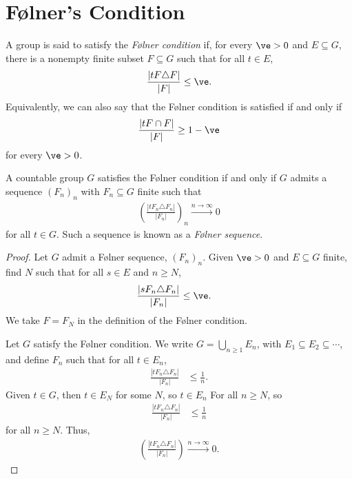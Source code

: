\section{Følner's Condition}%
\begin{definition}\label{def:folner_condition}
  A group is said to satisfy the \textit{Følner condition} if, for every $\ve > 0$ and $E\subseteq G$, there is a nonempty finite subset $F\subseteq G$ such that for all $t\in E$,
  \begin{align*}
    \frac{\left\vert tF\triangle F \right\vert}{\left\vert F \right\vert}\leq \ve.
  \end{align*}
  Equivalently, we can also say that the Følner condition is satisfied if and only if
  \begin{align*}
    \frac{\left\vert tF\cap F \right\vert}{\left\vert F \right\vert} \geq 1 - \ve
  \end{align*}
  for every $\ve > 0$.
\end{definition}
\begin{lemma}\label{lemma:folner_sequences}
  A countable group $G$ satisfies the Følner condition if and only if $G$ admits a sequence $\left(F_n\right)_n$ with $F_n\subseteq G$ finite such that
  \begin{align*}
    \left(\frac{\left\vert tF_n\triangle F_n \right\vert}{\left\vert F_n \right\vert}\right)_n \xrightarrow{n\rightarrow \infty}0
  \end{align*}
  for all $t\in G$. Such a sequence is known as a \textit{Følner sequence}.
\end{lemma}
\begin{proof}
  Let $G$ admit a Følner sequence, $\left(F_n\right)_n$. Given $\ve > 0$ and $E\subseteq G$ finite, find $N$ such that for all $s\in E$ and $n\geq N$,
  \begin{align*}
    \frac{\left\vert sF_n\triangle F_n \right\vert}{\left\vert F_n \right\vert} &\leq \ve.
  \end{align*}
  We take $F = F_N$ in the definition of the Følner condition.\newline

  Let $G$ satisfy the Følner condition. We write $G = \bigcup_{n\geq 1}E_n$, with $E_1\subseteq E_2\subseteq \cdots$, and define $F_n$ such that for all $t\in E_n$,
  \begin{align*}
    \frac{\left\vert tF_n\triangle F_n \right\vert}{\left\vert F_n \right\vert} &\leq \frac{1}{n}.
  \end{align*}
  Given $t\in G$, then $t\in E_N$ for some $N$, so $t\in E_n$ For all $n\geq N$, so
  \begin{align*}
    \frac{\left\vert tF_n\triangle F_n \right\vert}{\left\vert F_n \right\vert} &\leq \frac{1}{n}
  \end{align*}
  for all $n\geq N$. Thus,
  \begin{align*}
    \left(\frac{\left\vert tF_n\triangle F_n \right\vert}{\left\vert F_n \right\vert}\right)\xrightarrow{n\rightarrow\infty}0.
  \end{align*}
\end{proof}
